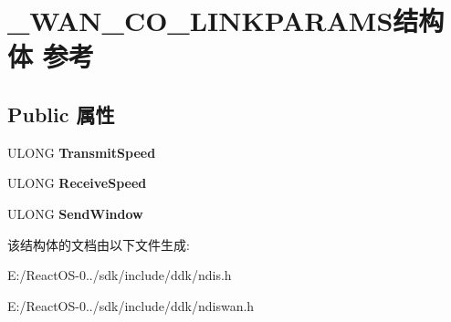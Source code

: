 \hypertarget{struct___w_a_n___c_o___l_i_n_k_p_a_r_a_m_s}{}\section{\+\_\+\+W\+A\+N\+\_\+\+C\+O\+\_\+\+L\+I\+N\+K\+P\+A\+R\+A\+M\+S结构体 参考}
\label{struct___w_a_n___c_o___l_i_n_k_p_a_r_a_m_s}
\subsection*{Public 属性}
\begin{DoxyCompactItemize}
\item 
\mbox{\label{struct___w_a_n___c_o___l_i_n_k_p_a_r_a_m_s_a9e35c865aff7db663f3d85f7b552244f}} 
U\+L\+O\+NG {\bfseries Transmit\+Speed}
\item 
\mbox{\label{struct___w_a_n___c_o___l_i_n_k_p_a_r_a_m_s_ac1133c9413bf4b6595608450b4c549ff}} 
U\+L\+O\+NG {\bfseries Receive\+Speed}
\item 
\mbox{\label{struct___w_a_n___c_o___l_i_n_k_p_a_r_a_m_s_a792e6c0fdd9348a32fab8c85b35b46b1}} 
U\+L\+O\+NG {\bfseries Send\+Window}
\end{DoxyCompactItemize}


该结构体的文档由以下文件生成\+:\begin{DoxyCompactItemize}
\item 
E\+:/\+React\+O\+S-\/0../sdk/include/ddk/ndis.\+h\item 
E\+:/\+React\+O\+S-\/0../sdk/include/ddk/ndiswan.\+h\end{DoxyCompactItemize}
